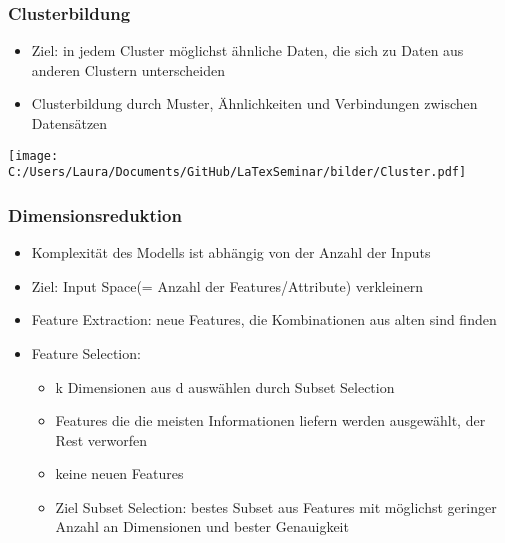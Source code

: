 \documentclass[11pt]{beamer}
\begin{document}
	\begin{frame}
		\frametitle{Clusterbildung}
		\begin{itemize}
			\item Ziel: in jedem Cluster möglichst ähnliche Daten, die sich zu Daten aus anderen Clustern unterscheiden
			\item Clusterbildung durch Muster, Ähnlichkeiten und Verbindungen zwischen Datensätzen
		\end{itemize}
		\texttt{[image: C:/Users/Laura/Documents/GitHub/LaTexSeminar/bilder/Cluster.pdf]}
	\end{frame}
	
	\begin{frame}
		\frametitle{Dimensionsreduktion}
		\begin{itemize}
			\item Komplexität des Modells ist abhängig von der Anzahl der Inputs
			\item Ziel: Input Space(= Anzahl der Features/Attribute) verkleinern
			\item Feature Extraction: neue Features, die Kombinationen aus alten sind finden 
			\item Feature Selection: 
				\begin{itemize}
					\item k Dimensionen aus d auswählen durch Subset Selection
					\item Features die die meisten Informationen liefern werden ausgewählt, der Rest verworfen
					\item keine neuen Features
					\item Ziel Subset Selection: bestes Subset aus Features mit möglichst geringer Anzahl an Dimensionen und bester Genauigkeit
				\end{itemize}
		\end{itemize}  
	\end{frame}
	
\end{document}
